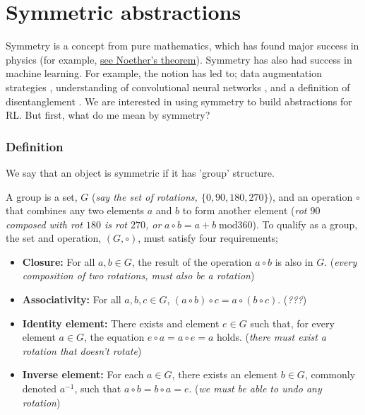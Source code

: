 \newpage
\section{Symmetric abstractions}\label{symmetric-abstractions}

Symmetry is a concept from pure mathematics, which has found major success in physics (for example, \href{https://en.wikipedia.org/wiki/Noether%27s_theorem}{see Noether's theorem}).
Symmetry has also had success in machine learning. For example, the notion has led to;
data augmentation strategies \cite{Simard2003},
understanding of convolutional neural networks \cite{Cohen2017}, and a definition of disentanglement \cite{Higgins2018}.
We are interested in using symmetry to build abstractions for RL. But first, what do me mean by symmetry?




\subsubsection{Definition}

We say that an object is symmetric if it has 'group' structure.

A group is a set, $G$ (\textit{say the set of rotations, $\{0, 90, 180, 270\}$}),
and an operation $\circ$ that combines any two elements $a$ and $b$ to form
another element (\textit{rot $90$ composed with rot $180$ is rot $270$, or} $a \circ b = a + b \;\text{mod} 360$).
To qualify as a group, the set and operation, $(G, \circ)$, must satisfy four requirements;

\begin{itemize}
	\tightlist
	\item \textbf{Closure:} For all $a, b \in G$, the result of the operation $a \circ b$ is also in $G$. (\textit{every composition of two rotations, must also be a rotation})
	\item \textbf{Associativity:} For all $a,b,c \in G$, $(a\circ b) \circ c = a\circ (b\circ c)$. (\textit{???})
	\item \textbf{Identity element:} There exists and element $e\in G$ such that, for every element $a\in G$, the equation $e\circ a = a\circ e = a$ holds. (\textit{there must exist a rotation that doesn't rotate})
	\item \textbf{Inverse element:} For each $a \in G$, there exists an element $b \in G$, commonly denoted $a^{−1}$, such that $a \circ b = b \circ a = e$. (\textit{we must be able to undo any rotation})
\end{itemize}



